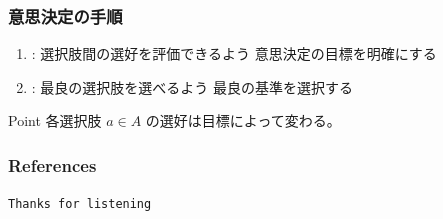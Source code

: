 \documentclass[aspectratio=169, 10pt, fleqn, hyperref={pdfpagelabels=false, bookmarks=false, hyperfootnotes=false}]{beamer}
\begin{document}
\begin{frame}[label=dmprocedure]
  \frametitle{意思決定の手順}
  \begin{enumerate}
    \item {}: 選択肢間の選好を評価できるよう
      意思決定の目標を明確にする
    \item {}: 最良の選択肢を選べるよう
      最良の基準を選択する
  \end{enumerate}
  \begin{alertblock}{Point}
    各選択肢 $a \in A$ の選好は目標によって変わる。
  \end{alertblock}
\end{frame}

\begin{frame}[label=bib]%
  \frametitle{References}
  \beamertemplatetextbibitems
      {\tiny
        
        
      }
\end{frame}

\begin{frame}
  \vspace*{\dimexpr\aauheaderheight+20pt\relax}
  \vfill
  \begin{center}
    {\tt Thanks for listening\exclaim}
  \end{center}
  \vfill
\end{frame}

\end{document}
